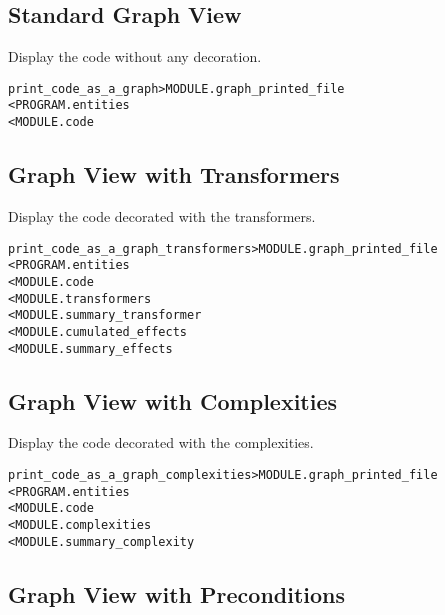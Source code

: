 \documentclass[a4paper]{report}
\newenvironment{PipsMake}{\begin{alltt}}{\end{alltt}}
\newenvironment{PipsPass}[1]{\label{pass:#1}}{}
\begin{document}
\subsection{Standard Graph View}

\begin{PipsPass}{print_code_as_a_graph}
Display the code without any decoration.
\end{PipsPass}

\begin{PipsMake}
print_code_as_a_graph                      > MODULE.graph_printed_file
        < PROGRAM.entities
        < MODULE.code
\end{PipsMake}

\subsection{Graph View with Transformers}

\begin{PipsPass}{print_code_as_a_graph_transformers}
Display the code decorated with the transformers.
\end{PipsPass}

\begin{PipsMake}
print_code_as_a_graph_transformers         > MODULE.graph_printed_file
        < PROGRAM.entities
        < MODULE.code
        < MODULE.transformers
        < MODULE.summary_transformer
        < MODULE.cumulated_effects
        < MODULE.summary_effects
\end{PipsMake}

\subsection{Graph View with Complexities}

\begin{PipsPass}{print_code_as_a_graph_complexities}
Display the code decorated with the complexities.
\end{PipsPass}

\begin{PipsMake}
print_code_as_a_graph_complexities         > MODULE.graph_printed_file
        < PROGRAM.entities
        < MODULE.code
        < MODULE.complexities
        < MODULE.summary_complexity
\end{PipsMake}

\subsection{Graph View with Preconditions}
\end{document}

